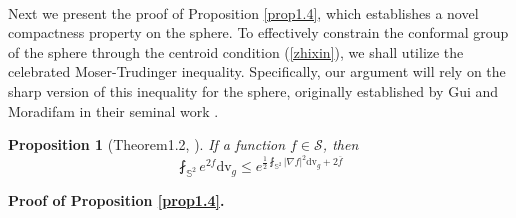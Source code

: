 \documentclass[a4paper, 12pt]{article}
\newtheorem{proposition}[theorem]{Proposition}
\begin{document}
\
\

Next we present the proof of Proposition \ref{prop1.4}, which establishes a novel compactness property on the sphere. To effectively constrain the conformal group of the sphere through the centroid condition (\ref{zhixin}), we shall utilize the celebrated Moser-Trudinger inequality. Specifically, our argument will rely on the sharp version of this inequality for the sphere, originally established by Gui and Moradifam in their seminal work \cite{MR3878729}.
\begin{proposition}[Theorem1.2, \cite{MR3878729}]
	If a function $f \in \mathscr{S}$, then
	\[\fint_{{\mathbb{S}^2}} {{e^{2f}}} {\text{d}}{{\text{v}}_g} \leq {e^{\frac{1}{2}\fint_{{\mathbb{S}^2}} {{{\left| {\nabla f} \right|}^2}} {\text{d}}{{\text{v}}_g} + 2\overline f }}\]
\end{proposition}
\noindent\textbf{Proof of Proposition \ref{prop1.4}. }
\end{document}
